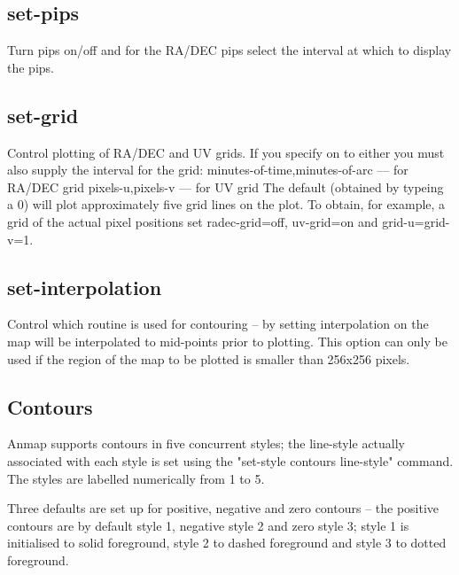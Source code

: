 \subsection{set-pips}


Turn pips on/off and for the RA/DEC pips select the interval at
which to display the pips.

\subsection{set-grid}


Control plotting of RA/DEC and UV grids. If you specify on to either
you must also supply the interval for the grid:
\newline
minutes-of-time,minutes-of-arc   ---    for RA/DEC grid
\newline
pixels-u,pixels-v                ---    for UV grid
\newline
The default (obtained by typeing a 0) will plot approximately five
grid lines on the plot. To obtain, for example, a grid of the actual
pixel positions set radec-grid=off, uv-grid=on and grid-u=grid-v=1.

\subsection{set-interpolation}


Control which routine is used for contouring -- by setting
interpolation on the map will be interpolated to mid-points
prior to plotting. This option can only be used if the region
of the map to be plotted is smaller than 256x256 pixels.

\subsection{Contours}

Anmap supports contours in five concurrent styles; the line-style actually
associated with each style is set using the "set-style contours line-style"
command.  The styles are labelled numerically from 1 to 5.

Three defaults are set up for positive, negative and zero contours -- the
positive contours are by default style 1, negative style 2 and zero style
3; style 1 is initialised to solid foreground, style 2 to dashed foreground
and style 3 to dotted foreground.

